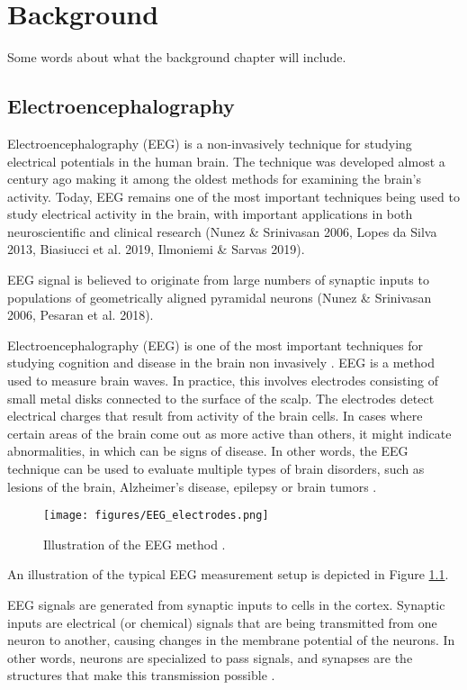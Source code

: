 \documentclass[a4paper, UKenglish, 11pt]{uiomaster}
\begin{document}
\chapter{Background}
Some words about what the background chapter will include.

\section{Electroencephalography}
Electroencephalography (EEG) is a non-invasively technique for studying electrical potentials in the human brain. The technique was developed almost a century ago making it among the oldest methods for examining the brain's activity. Today, EEG remains one of the most important techniques being used to study electrical activity in the brain, with important applications in both neuroscientific and clinical research (Nunez & Srinivasan 2006, Lopes da Silva 2013, Biasiucci et al. 2019, Ilmoniemi & Sarvas 2019).

EEG signal is believed to originate from large numbers of synaptic inputs to populations of geometrically aligned pyramidal neurons (Nunez & Srinivasan 2006, Pesaran et al. 2018).

Electroencephalography (EEG) is one of the most important techniques for studying cognition and disease in the brain non invasively \cite{95}. EEG is a method used to measure brain waves. In practice, this involves electrodes consisting of small metal disks connected to the surface of the scalp. The electrodes detect electrical charges that result from activity of the brain cells. In cases where certain areas of the brain come out as more active than others, it might indicate abnormalities, in which can be signs of disease. In other words, the EEG technique can be used to evaluate multiple types of brain disorders, such as lesions of the brain, Alzheimer's disease, epilepsy or brain tumors \cite{96}.

\begin{figure}[H]
    \centering
    \texttt{[image: figures/EEG\_electrodes.png]}
    \caption{Illustration of the EEG method \cite{97}.}
    \label{fig:EEG}
\end{figure}

An illustration of the typical EEG measurement setup is depicted in Figure \ref{fig:EEG}.

EEG signals are generated from synaptic inputs to cells in the cortex. Synaptic inputs are electrical (or chemical) signals that are being transmitted from one neuron to another, causing changes in the membrane potential of the neurons. In other words, neurons are specialized to pass signals, and synapses are the structures that make this transmission possible \cite{105}.
\end{document}
